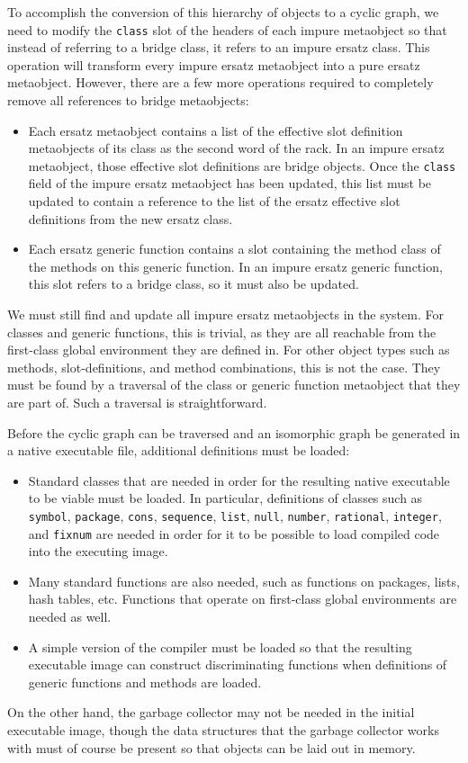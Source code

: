 To accomplish the conversion of this hierarchy of objects to a cyclic
graph, we need to modify the \texttt{class} slot of the headers of
each impure metaobject so that instead of referring to a bridge class,
it refers to an impure ersatz class.  This operation will transform
every impure ersatz metaobject into a pure ersatz metaobject.
However, there are a few more operations required to completely remove
all references to bridge metaobjects:

\begin{itemize}
\item Each ersatz metaobject contains a list of the effective slot
  definition metaobjects of its class as the second word of the rack.
  In an impure ersatz metaobject, those effective slot definitions are
  bridge objects.  Once the \texttt{class} field of the impure ersatz
  metaobject has been updated, this list must be updated to contain a
  reference to the list of the ersatz effective slot definitions from
  the new ersatz class.
\item Each ersatz generic function contains a slot containing the
  method class of the methods on this generic function.  In an impure
  ersatz generic function, this slot refers to a bridge class, so it
  must also be updated.
\end{itemize}

We must still find and update all impure ersatz metaobjects in the
system.  For classes and generic functions, this is trivial, as they
are all reachable from the first-class global environment they are
defined in.  For other object types such as methods, slot-definitions,
and method combinations, this is not the case.  They must be found by
a traversal of the class or generic function metaobject that they are
part of.  Such a traversal is straightforward.

Before the cyclic graph can be traversed and an isomorphic graph be
generated in a native executable file, additional definitions must be
loaded:

\begin{itemize}
\item Standard classes that are needed in order for the resulting
  native executable to be viable must be loaded.  In particular,
  definitions of classes such as \texttt{symbol}, \texttt{package},
  \texttt{cons}, \texttt{sequence}, \texttt{list}, \texttt{null},
  \texttt{number}, \texttt{rational}, \texttt{integer}, and
  \texttt{fixnum} are needed in order for it to be possible to load
  compiled code into the executing image.
\item Many standard functions are also needed, such as functions on
  packages, lists, hash tables, etc.  Functions that operate on
  first-class global environments are needed as well.
\item A simple version of the compiler must be loaded so that the
  resulting executable image can construct discriminating functions
  when definitions of generic functions and methods are loaded.
\end{itemize}

On the other hand, the garbage collector may not be needed in the
initial executable image, though the data structures that the garbage
collector works with must of course be present so that objects can be
laid out in memory.

